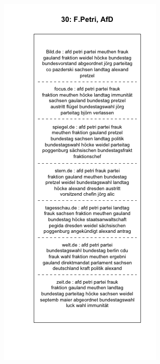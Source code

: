 \documentclass[12pt,a4paper,notitlepage]{article}
\begin{document}
\begin{figure}[H]
	\begin{center}
		\begin{subfigure}[normla]{0.49\textwidth}
			\includegraphics[width=\textwidth]{../figs/plotquote30.png}

\end{subfigure}
\end{center}
\end{figure}
\end{document}
